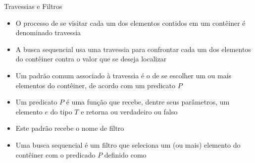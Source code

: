 \begin{frame}[fragile]{Travessias e Filtros}

    \begin{itemize}
        \item O processo de se visitar cada um dos elementos contidos em um contêiner é
            denominado travessia

        \item A busca sequencial usa uma travessia para confrontar cada um dos elementos 
            do contêiner contra o valor que se deseja localizar

        \item Um padrão comum associado à travessia é o de se escolher um ou mais elementos do
            contêiner, de acordo com um predicato $P$

        \item Um predicato $P$ é uma função que recebe, dentre seus parâmetros, um elemento $e$ do 
        tipo $T$ e retorna ou verdadeiro ou falso

        \item Este padrão recebe o nome de filtro

        \item Uma busca sequencial é um filtro que seleciona um (ou mais) elemento do contêiner
            com o predicado $P$ definido como

    \end{itemize}

\end{frame}

